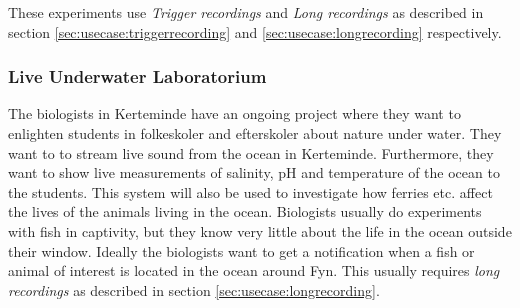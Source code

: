 These experiments use \textit{Trigger recordings} and \textit{Long recordings} as described in section \ref{sec:usecase:triggerrecording} and \ref{sec:usecase:longrecording} respectively.

\subsubsection{Live Underwater Laboratorium} \label{sec:usecase:liveunderwater}
The biologists in Kerteminde have an ongoing project where they want to enlighten students in folkeskoler and efterskoler about nature under water. They want to to stream live sound from the ocean in Kerteminde. Furthermore, they want to show live measurements of salinity, pH and temperature of the ocean to the students.
This system will also be used to investigate how ferries etc. affect the lives of the animals living in the ocean. Biologists usually do experiments with fish in captivity, but they know very little about the life in the ocean outside their window. Ideally the biologists want to get a notification when a fish or animal of interest is located in the ocean around Fyn. This usually requires \textit{long recordings} as described in section \ref{sec:usecase:longrecording}.


